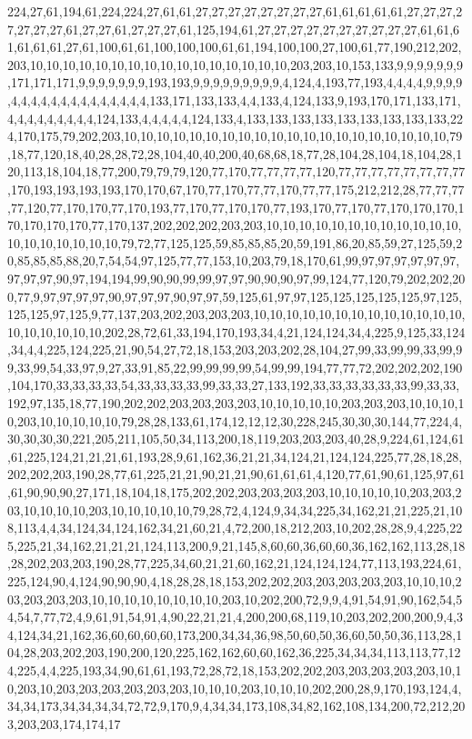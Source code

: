 224,27,61,194,61,224,224,27,61,61,27,27,27,27,27,27,27,27,61,61,61,61,61,27,27,27,27,27,27,27,61,27,27,61,27,27,27,61,125,194,61,27,27,27,27,27,27,27,27,27,27,61,61,61,61,61,61,27,61,100,61,61,100,100,100,61,61,194,100,100,27,100,61,77,190,212,202,203,10,10,10,10,10,10,10,10,10,10,10,10,10,10,10,10,203,203,10,153,133,9,9,9,9,9,9,9,171,171,171,9,9,9,9,9,9,9,193,193,9,9,9,9,9,9,9,9,9,4,124,4,193,77,193,4,4,4,4,9,9,9,9,4,4,4,4,4,4,4,4,4,4,4,4,4,4,133,171,133,133,4,4,133,4,124,133,9,193,170,171,133,171,4,4,4,4,4,4,4,4,4,124,133,4,4,4,4,4,124,133,4,133,133,133,133,133,133,133,133,133,224,170,175,79,202,203,10,10,10,10,10,10,10,10,10,10,10,10,10,10,10,10,10,10,10,10,79,18,77,120,18,40,28,28,72,28,104,40,40,200,40,68,68,18,77,28,104,28,104,18,104,28,120,113,18,104,18,77,200,79,79,79,120,77,170,77,77,77,77,120,77,77,77,77,77,77,77,77,170,193,193,193,193,170,170,67,170,77,170,77,77,170,77,77,175,212,212,28,77,77,77,77,120,77,170,170,77,170,193,77,170,77,170,170,77,193,170,77,170,77,170,170,170,170,170,170,170,77,170,137,202,202,202,203,203,10,10,10,10,10,10,10,10,10,10,10,10,10,10,10,10,10,10,10,79,72,77,125,125,59,85,85,85,20,59,191,86,20,85,59,27,125,59,20,85,85,85,88,20,7,54,54,97,125,77,77,153,10,203,79,18,170,61,99,97,97,97,97,97,97,97,97,97,90,97,194,194,99,90,90,99,99,97,97,90,90,90,97,99,124,77,120,79,202,202,200,77,9,97,97,97,97,90,97,97,97,90,97,97,59,125,61,97,97,125,125,125,125,125,97,125,125,125,97,125,9,77,137,203,202,203,203,203,10,10,10,10,10,10,10,10,10,10,10,10,10,10,10,10,10,10,10,202,28,72,61,33,194,170,193,34,4,21,124,124,34,4,225,9,125,33,124,34,4,4,225,124,225,21,90,54,27,72,18,153,203,203,202,28,104,27,99,33,99,99,33,99,99,33,99,54,33,97,9,27,33,91,85,22,99,99,99,99,54,99,99,194,77,77,72,202,202,202,190,104,170,33,33,33,33,54,33,33,33,33,99,33,33,27,133,192,33,33,33,33,33,33,99,33,33,192,97,135,18,77,190,202,202,203,203,203,203,10,10,10,10,10,203,203,203,10,10,10,10,203,10,10,10,10,10,79,28,28,133,61,174,12,12,12,30,228,245,30,30,30,144,77,224,4,30,30,30,30,221,205,211,105,50,34,113,200,18,119,203,203,203,40,28,9,224,61,124,61,61,225,124,21,21,21,61,193,28,9,61,162,36,21,21,34,124,21,124,124,225,77,28,18,28,202,202,203,190,28,77,61,225,21,21,90,21,21,90,61,61,61,4,120,77,61,90,61,125,97,61,61,90,90,90,27,171,18,104,18,175,202,202,203,203,203,203,10,10,10,10,10,203,203,203,10,10,10,10,203,10,10,10,10,10,79,28,72,4,124,9,34,34,225,34,162,21,21,225,21,108,113,4,4,34,124,34,124,162,34,21,60,21,4,72,200,18,212,203,10,202,28,28,9,4,225,225,225,21,34,162,21,21,21,124,113,200,9,21,145,8,60,60,36,60,60,36,162,162,113,28,18,28,202,203,203,190,28,77,225,34,60,21,21,60,162,21,124,124,124,77,113,193,224,61,225,124,90,4,124,90,90,90,4,18,28,28,18,153,202,202,203,203,203,203,203,10,10,10,203,203,203,203,10,10,10,10,10,10,10,10,203,10,202,200,72,9,9,4,91,54,91,90,162,54,54,54,7,77,72,4,9,61,91,54,91,4,90,22,21,21,4,200,200,68,119,10,203,202,200,200,9,4,34,124,34,21,162,36,60,60,60,60,173,200,34,34,36,98,50,60,50,36,60,50,50,36,113,28,104,28,203,202,203,190,200,120,225,162,162,60,60,162,36,225,34,34,34,113,113,77,124,225,4,4,225,193,34,90,61,61,193,72,28,72,18,153,202,202,203,203,203,203,203,10,10,203,10,203,203,203,203,203,203,10,10,10,203,10,10,10,202,200,28,9,170,193,124,4,34,34,173,34,34,34,34,72,72,9,170,9,4,34,34,173,108,34,82,162,108,134,200,72,212,203,203,203,174,174,17
